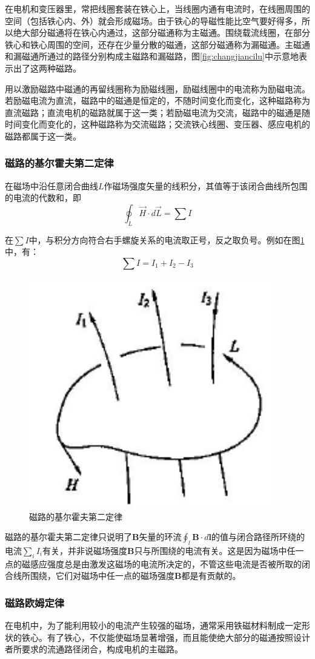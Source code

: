 \documentclass{book}
\begin{document}
在电机和变压器里，常把线圈套装在铁心上，当线圈内通有电流时，在线圈周围的空间（包括铁心内、外）就会形成磁场。由于铁心的导磁性能比空气要好得多，所以绝大部分磁通将在铁心内通过，这部分磁通称为主磁通。围绕载流线圈，在部分铁心和铁心周围的空间，还存在少量分散的磁通，这部分磁通称为漏磁通。主磁通和漏磁通所通过的路径分别构成主磁路和漏磁路，图\ref{fig:changjiancilu}中示意地表示出了这两种磁路。

用以激励磁路中磁通的再留线圈称为励磁线圈，励磁线圈中的电流称为励磁电流。若励磁电流为直流，磁路中的磁通是恒定的，不随时间变化而变化，这种磁路称为直流磁路；直流电机的磁路就属于这一类；若励磁电流为交流，磁路中的磁通是随时间变化而变化的，这种磁路称为交流磁路；交流铁心线圈、变压器、感应电机的磁路都属于这一类。
\subsubsection{磁路的基尔霍夫第二定律}
在磁场中沿任意闭合曲线$L$作磁场强度矢量的线积分，其值等于该闭合曲线所包围的电流的代数和，即
\begin{equation}
\oint_{L}{\vec{H}\cdot d\vec{L}=\sum{I}}
\label{eq1.3}
\end{equation}

在$\sum{I}$中，与积分方向符合右手螺旋关系的电流取正号，反之取负号。例如在图\ref{fig:kvlmag}中，有：
\[\sum{I}={{I}_{1}}+{{I}_{2}}-{{I}_{3}}\]
\begin{figure}[H]
	\centering
	\includegraphics[width=25pc]{kvlmag}
	\caption{磁路的基尔霍夫第二定律}
	\label{fig:kvlmag}
\end{figure}
磁路的基尔霍夫第二定律只说明了$\bm{B}$矢量的环流$\oint_l\bm{B}\cdot d\bm{l}$的值与闭合路径所环绕的电流$\sum_{i}I_i$有关，并非说磁场强度$\bm{B}$只与所围绕的电流有关。这是因为磁场中任一点的磁感应强度总是由激发这磁场的电流所决定的，不管这些电流是否被所取的闭合线所围绕，它们对磁场中任一点的磁场强度$\bm{B}$都是有贡献的。
\subsubsection{磁路欧姆定律}
在电机中，为了能利用较小的电流产生较强的磁场，通常采用铁磁材料制成一定形状的铁心。有了铁心，不仅能使磁场显著增强，而且能使绝大部分的磁通按照设计者所要求的流通路径闭合，构成电机的主磁路。
\end{document}
